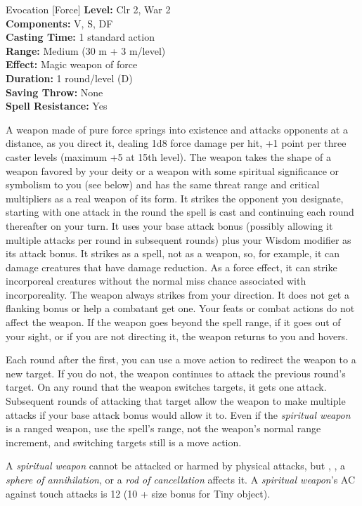 {Evocation [Force]}
{
	\textbf{Level:}
	Clr 2, War 2\\
	\textbf{Components:}
	V, S, DF\\
	\textbf{Casting Time:}
	1 standard action\\
	\textbf{Range:}
	Medium (30 m + 3 m/level)\\
	\textbf{Effect:}
	Magic weapon of force\\
	\textbf{Duration:}
	1 round/level (D)\\
	\textbf{Saving Throw:}
	None\\
	\textbf{Spell Resistance:}
	Yes\\
}
{
	A weapon made of pure force springs into existence and attacks opponents at a distance, as you direct it, dealing 1d8 force damage per hit, +1 point per three caster levels (maximum +5 at 15th level). The weapon takes the shape of a weapon favored by your deity or a weapon with some spiritual significance or symbolism to you (see below) and has the same threat range and critical multipliers as a real weapon of its form. It strikes the opponent you designate, starting with one attack in the round the spell is cast and continuing each round thereafter on your turn. It uses your base attack bonus (possibly allowing it multiple attacks per round in subsequent rounds) plus your Wisdom modifier as its attack bonus. It strikes as a spell, not as a weapon, so, for example, it can damage creatures that have damage reduction. As a force effect, it can strike incorporeal creatures without the normal miss chance associated with incorporeality. The weapon always strikes from your direction. It does not get a flanking bonus or help a combatant get one. Your feats or combat actions do not affect the weapon. If the weapon goes beyond the spell range, if it goes out of your sight, or if you are not directing it, the weapon returns to you and hovers.

	Each round after the first, you can use a move action to redirect the weapon to a new target. If you do not, the weapon continues to attack the previous round's target. On any round that the weapon switches targets, it gets one attack. Subsequent rounds of attacking that target allow the weapon to make multiple attacks if your base attack bonus would allow it to. Even if the \emph{spiritual weapon} is a ranged weapon, use the spell's range, not the weapon's normal range increment, and switching targets still is a move action.

	A \emph{spiritual weapon} cannot be attacked or harmed by physical attacks, but , , a \emph{sphere of annihilation}, or a \emph{rod of cancellation} affects it. A \emph{spiritual weapon}'s AC against touch attacks is 12 (10 + size bonus for Tiny object).

}
